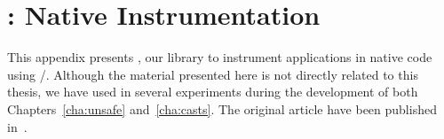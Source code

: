 \chapter{\jnif{}: \java{} Native Instrumentation}
\label{ap:jnif}

This appendix presents \jnif{}, our library to instrument \java{} applications in native code using \cc{}/\cpp{}.
Although the material presented here is not directly related to this thesis, we have used \jnif{} in several experiments during the development of both Chapters~\ref{cha:unsafe} and~\ref{cha:casts}.
The original article have been published in~\cite{mastrangeloJNIFJavaNative2014}.









